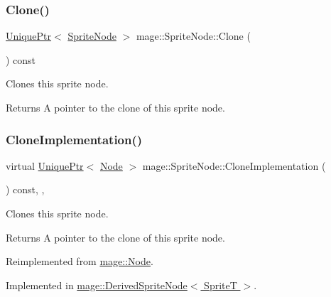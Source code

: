 \subsubsection{\texorpdfstring{Clone()}{Clone()}}
{\footnotesize\ttfamily \hyperlink{namespacemage_a3316d7143a973e37adf1110f2e80ca31}{Unique\+Ptr}$<$ \hyperlink{classmage_1_1_sprite_node}{Sprite\+Node} $>$ mage\+::\+Sprite\+Node\+::\+Clone (\begin{DoxyParamCaption}{ }\end{DoxyParamCaption}) const}

Clones this sprite node.

\begin{DoxyReturn}{Returns}
A pointer to the clone of this sprite node. 
\end{DoxyReturn}
\hypertarget{classmage_1_1_sprite_node_a83a2a865b38670d64491a1066895e218}{}\label{classmage_1_1_sprite_node_a83a2a865b38670d64491a1066895e218} 
\subsubsection{\texorpdfstring{Clone\+Implementation()}{CloneImplementation()}}
{\footnotesize\ttfamily virtual \hyperlink{namespacemage_a3316d7143a973e37adf1110f2e80ca31}{Unique\+Ptr}$<$ \hyperlink{classmage_1_1_node}{Node} $>$ mage\+::\+Sprite\+Node\+::\+Clone\+Implementation (\begin{DoxyParamCaption}{ }\end{DoxyParamCaption}) const\hspace{0.3cm}{\ttfamily [override]}, {\ttfamily [private]}, {}}

Clones this sprite node.

\begin{DoxyReturn}{Returns}
A pointer to the clone of this sprite node. 
\end{DoxyReturn}


Reimplemented from \hyperlink{classmage_1_1_node_a71a4763bfd4cba5653488b490e61dc8f}{mage\+::\+Node}.



Implemented in \hyperlink{classmage_1_1_derived_sprite_node_ae1aa2b80d4ff8688635df017826c11a5}{mage\+::\+Derived\+Sprite\+Node$<$ Sprite\+T $>$}.

\hypertarget{classmage_1_1_sprite_node_a84806dd38c94900f0fabf0163a706370}{}\label{classmage_1_1_sprite_node_a84806dd38c94900f0fabf0163a706370} 
